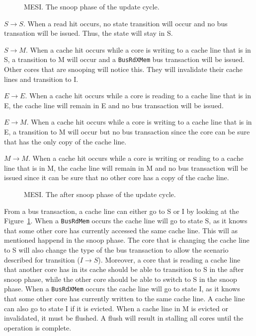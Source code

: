 \begin{figure}[H]
    \centering
    \caption{MESI. The snoop phase of the update cycle.}
    \label{fig:mesi_snoop}
\end{figure}

$S \to S$.
When a read hit occurs, no state transition will occur and no bus transation will be issued.
Thus, the state will stay in S.

$S \to M$.
When a cache hit occurs while a core is writing to a cache line that is in S, a transition to M will occur and a \texttt{BusRdXMem} bus transaction will be issued.
Other cores that are snooping will notice this.
They will invalidate their cache lines and transition to I.

$E \to E$.
When a cache hit occurs while a core is reading to a cache line that is in E, the cache line will remain in E and no bus transaction will be issued.

$E \to M$.
When a cache hit occurs while a core is writing to a cache line that is in E, a transition to M will occur but no bus transaction since the core can be sure that has the only copy of the cache line.

$M \to M$.
When a cache hit occurs while a core is writing or reading to a cache line that is in M, the cache line will remain in M and no bus transaction will be issued since it can be sure that no other core has a copy of the cache line.


\begin{figure}[H]
    \centering
    \caption{MESI. The after snoop phase of the update cycle.}
    \label{fig:mesi_after_snoop}
\end{figure}

From a bus transaction, a cache line can either go to S or I by looking at the Figure~\ref{fig:mesi_snoop}.
When a \texttt{BusRdMem} occurs the cache line will go to state S, as it knows that some other core has currently accessed the same cache line.
This will as mentioned happend in the snoop phase.
The core that is changing the cache line to S will also change the type of the bus transaction to allow the scenario described for transition ($I \to S$).
Moreover, a core that is reading a cache line that another core has in its cache should be able to transition to S in the after snoop phase, while the other core should be able to switch to S in the snoop phase.
When a \texttt{BusRdXMem} occurs the cache line will go to state I, as it knows that some other core has currently written to the same cache line.
A cache line can also go to state I if it is evicted.
When a cache line in M is evicted or invalidated, it must be flushed.
A flush will result in stalling all cores until the operation is complete.

